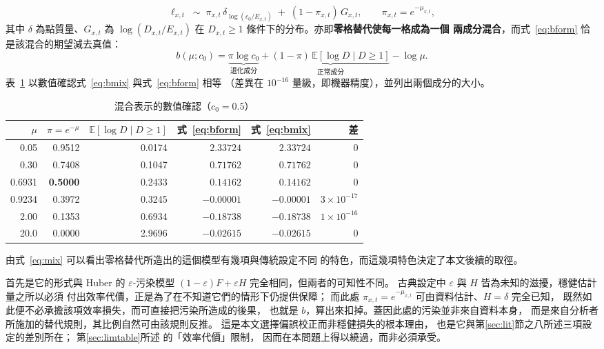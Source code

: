 \documentclass[UTF8, fontset=macnew, a4paper, 12pt]{ctexart}
\newcommand{\Ex}{\mathbb{E}}
\begin{document}
\begin{equation}\label{eq:mix}
\ell_{x,t}\;\sim\;\pi_{x,t}\,\delta_{\log(c_0/E_{x,t})}
\;+\;(1-\pi_{x,t})\,G_{x,t},
\qquad \pi_{x,t}=e^{-\mu_{x,t}},
\end{equation}
其中 $\delta$ 為點質量、$G_{x,t}$ 為 $\log(D_{x,t}/E_{x,t})$ 在
$D_{x,t}\ge1$ 條件下的分布。亦即\textbf{零格替代使每一格成為一個
兩成分混合}，而式~\eqref{eq:bform} 恰是該混合的期望減去真值：
\begin{equation}\label{eq:bmix}
b(\mu;c_0)=\underbrace{\pi\log c_0}_{\text{退化成分}}
+\underbrace{(1-\pi)\,\Ex[\log D\mid D\ge1]}_{\text{正常成分}}-\log\mu .
\end{equation}
表~\ref{tab:mix} 以數值確認式~\eqref{eq:bmix} 與式~\eqref{eq:bform} 相等
（差異在 $10^{-16}$ 量級，即機器精度），並列出兩個成分的大小。

\begin{table}[H]
\centering
\caption{混合表示的數值確認（$c_0=0.5$）}
\small
\begin{tabular}{rrrrrr}
\toprule
$\mu$ & $\pi=e^{-\mu}$ & $\Ex[\log D\mid D\ge1]$ & 式~\eqref{eq:bform} & 式~\eqref{eq:bmix} & 差\\
\midrule
0.05   & 0.9512 & 0.0174 & $2.33724$  & $2.33724$  & $0$\\
0.30   & 0.7408 & 0.1047 & $0.71762$  & $0.71762$  & $0$\\
0.6931 & \textbf{0.5000} & 0.2433 & $0.14162$  & $0.14162$  & $0$\\
0.9234 & 0.3972 & 0.3245 & $-0.00001$ & $-0.00001$ & $3\times10^{-17}$\\
2.00   & 0.1353 & 0.6934 & $-0.18738$ & $-0.18738$ & $1\times10^{-16}$\\
20.0   & 0.0000 & 2.9696 & $-0.02615$ & $-0.02615$ & $0$\\
\bottomrule
\end{tabular}
\label{tab:mix}
\end{table}

由式~\eqref{eq:mix} 可以看出零格替代所造出的這個模型有幾項與傳統設定不同
的特色，而這幾項特色決定了本文後續的取徑。

首先是它的形式與 Huber 的 $\varepsilon$-污染模型
$(1-\varepsilon)F+\varepsilon H$ 完全相同，但兩者的可知性不同。
古典設定中 $\varepsilon$ 與 $H$ 皆為未知的滋擾，穩健估計量之所以必須
付出效率代價，正是為了在不知道它們的情形下仍提供保障；
而此處 $\pi_{x,t}=e^{-\mu_{x,t}}$ 可由資料估計、$H=\delta$ 完全已知，
既然如此便不必承擔該項效率損失，而可直接把污染所造成的後果，
也就是 $b$，算出來扣掉。蓋因此處的污染並非來自資料本身，
而是來自分析者所施加的替代規則，其比例自然可由該規則反推。
這是本文選擇偏誤校正而非穩健損失的根本理由，
也是它與第\ref{sec:lit}節之八所述三項設定的差別所在；
第\ref{sec:limtable}所述 \citet{huber1964}的「效率代價」限制，
因而在本問題上得以繞過，而非必須承受。
\end{document}
